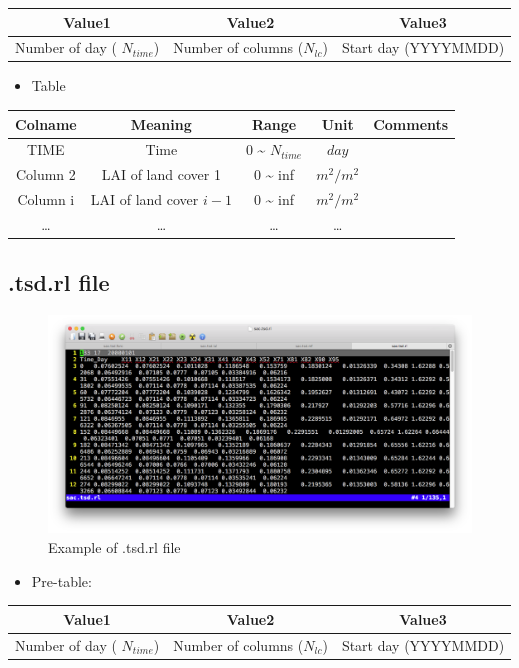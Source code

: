 \documentclass[]{scrbook}
\providecommand{\tightlist}{%
  \setlength{\itemsep}{0pt}\setlength{\parskip}{0pt}}
\begin{document}
\begin{longtable}[]{@{}ccc@{}}
\toprule
Value1 & Value2 & Value3\tabularnewline
\midrule
\endhead
Number of day ( \(N_{time}\)) & Number of columns (\(N_{lc}\)) & Start
day (YYYYMMDD)\tabularnewline
\bottomrule
\end{longtable}

\begin{itemize}
\tightlist
\item
  Table
\end{itemize}

\begin{longtable}[]{@{}ccccc@{}}
\toprule
Colname & Meaning & Range & Unit & Comments\tabularnewline
\midrule
\endhead
TIME & Time & 0 \textasciitilde{} \(N_{time}\) & \(day\)
&\tabularnewline
Column 2 & LAI of land cover 1 & 0 \textasciitilde{} inf & \(m^2/m^2\)
&\tabularnewline
Column i & LAI of land cover \(i-1\) & 0 \textasciitilde{} inf &
\(m^2/m^2\) &\tabularnewline
\ldots{} & \ldots{} & \ldots{} & \ldots{} &\tabularnewline
\bottomrule
\end{longtable}

\subsection{.tsd.rl file}\label{tsd.rl-file}

\begin{figure}
\centering
\includegraphics{Fig/IO/tsd.rl.png}
\caption{Example of .tsd.rl file}
\end{figure}

\begin{itemize}
\tightlist
\item
  Pre-table:
\end{itemize}

\begin{longtable}[]{@{}ccc@{}}
\toprule
Value1 & Value2 & Value3\tabularnewline
\midrule
\endhead
Number of day ( \(N_{time}\)) & Number of columns (\(N_{lc}\)) & Start
day (YYYYMMDD)\tabularnewline
\bottomrule
\end{longtable}
\end{document}
